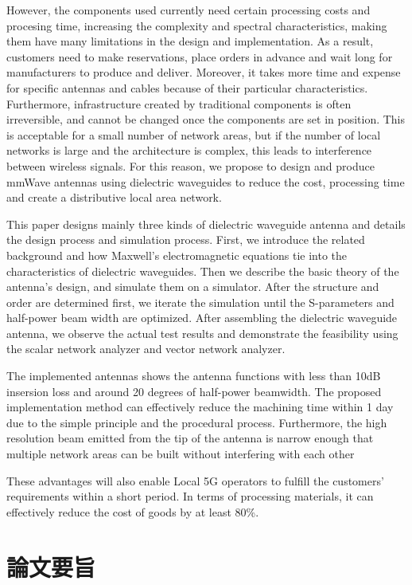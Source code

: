 \documentclass[a4paper,12pt]{report}
\begin{document}
However, the components used currently need certain
processing costs and  procesing time,
increasing the complexity and spectral characteristics,
making them have many limitations in the design and implementation.
As a result, customers need to make reservations, place orders in advance
and wait long for manufacturers to produce and deliver. Moreover, it takes
more time and expense for specific antennas and cables because of their particular
characteristics. Furthermore, infrastructure created by traditional components
is often irreversible, and cannot be changed once
the components are set in position.
This is acceptable for a small number of network areas, but if the number
of local networks is large and the architecture is complex,
this leads to interference between wireless signals.
For this reason, we propose to design and produce
mmWave antennas using dielectric waveguides to reduce the cost, processing time
and create a distributive local area network.

This paper designs mainly three kinds of dielectric waveguide antenna
and details the design process and simulation process.
First, we introduce the related background
and how Maxwell's electromagnetic equations tie into the characteristics
of dielectric waveguides.
Then we describe the basic theory of the antenna's design,
and simulate them on a simulator.
After the structure and order are determined first,
we iterate the simulation until
the S-parameters and half-power beam width are optimized.
After
assembling the dielectric waveguide antenna,
we observe the actual
test results and demonstrate the feasibility
using the scalar network analyzer and vector network analyzer.

The implemented antennas shows the antenna functions with less than 10dB
insersion loss and around 20 degrees of half-power beamwidth.
The proposed implementation
method can effectively reduce the machining time within 1 day
due to the simple principle and the procedural process.
Furthermore, the high resolution beam
emitted from the tip of the antenna is narrow enough
that multiple network areas can be built without interfering with each other

These advantages will also enable Local 5G operators
to fulfill the customers' requirements within a short period. In terms of
processing materials,
it can effectively reduce the cost of goods by at least
80\%.

\chapter*{\centering 論文要旨}
\end{document}
